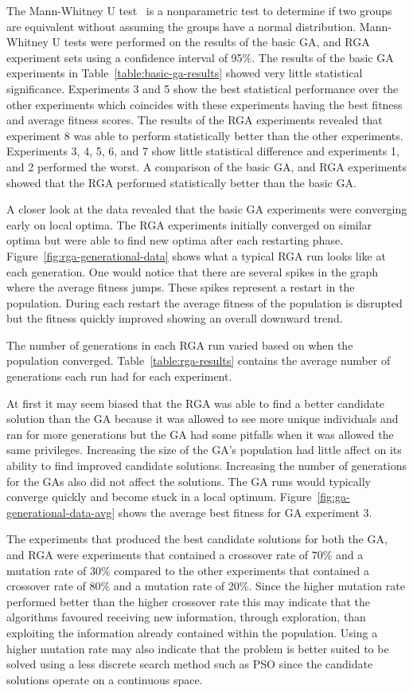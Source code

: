 The Mann-Whitney U test~\cite{mcknight2010mann} is a nonparametric test to determine if two groups are equivalent without assuming the groups have a normal distribution. Mann-Whitney U tests were performed on the results of the basic GA, and RGA experiment sets using a confidence interval of 95\%. The results of the basic GA experiments in Table~\ref{table:basic-ga-results} showed very little statistical significance. Experiments 3 and 5 show the best statistical performance over the other experiments which coincides with these experiments having the best fitness and average fitness scores. The results of the RGA experiments revealed that experiment 8 was able to perform statistically better than the other experiments. Experiments 3, 4, 5, 6, and 7 show little statistical difference and experiments 1, and 2 performed the worst. A comparison of the basic GA, and RGA experiments showed that the RGA performed statistically better than the basic GA.

A closer look at the data revealed that the basic GA experiments were converging early on local optima. The RGA experiments initially converged on similar optima but were able to find new optima after each restarting phase. Figure~\ref{fig:rga-generational-data} shows what a typical RGA run looks like at each generation. One would notice that there are several spikes in the graph where the average fitness jumps. These spikes represent a restart in the population. During each restart the average fitness of the population is disrupted but the fitness quickly improved showing an overall downward trend.

The number of generations in each RGA run varied based on when the population converged. Table~\ref{table:rga-results} contains the average number of generations each run had for each experiment.

At first it may seem biased that the RGA was able to find a better candidate solution than the GA because it was allowed to see more unique individuals and ran for more generations but the GA had some pitfalls when it was allowed the same privileges. Increasing the size of the GA's population had little affect on its ability to find improved candidate solutions. Increasing the number of generations for the GAs also did not affect the solutions. The GA runs would typically converge quickly and become stuck in a local optimum. Figure~\ref{fig:ga-generational-data-avg} shows the average best fitness for GA experiment 3.

The experiments that produced the best candidate solutions for both the GA, and RGA were experiments that contained a crossover rate of 70\% and a mutation rate of 30\% compared to the other experiments that contained a crossover rate of 80\% and a mutation rate of 20\%. Since the higher mutation rate performed better than the higher crossover rate this may indicate that the algorithms favoured receiving new information, through exploration, than exploiting the information already contained within the population. Using a higher mutation rate may also indicate that the problem is better suited to be solved using a less discrete search method such as PSO since the candidate solutions operate on a continuous space.

